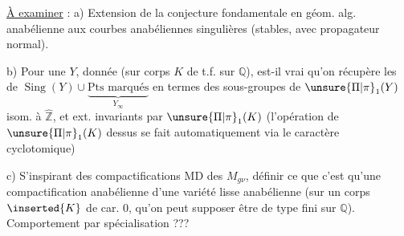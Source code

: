 
\uline{À examiner} : a) Extension de la conjecture fondamentale en géom. alg. anabélienne aux courbes anabéliennes  singulières (stables, avec propagateur normal). 

b) Pour une $Y$,  donnée (sur corps $K$ de t.f. sur $\mathbb Q$), est-il vrai qu'on récupère les  de  $\operatorname{Sing}(Y)\cup\underbrace{\text{Pts marqués}}_{Y_\infty}$ en termes des  sous-groupes de $\unsure{\Pi|\pi}_1(Y)$ isom. à $\widehat{\mathbb Z}$, et ext. invariants par $\unsure{\Pi|\pi}_1(K)$ (l'opération de $\unsure{\Pi|\pi}_1(K)$ dessus se fait automatiquement via le caractère cyclotomique)

c) S'inspirant des compactifications MD des $M_{g\nu}$, définir ce que c'est qu'une compactification anabélienne d'une variété lisse anabélienne (sur un corps $\inserted{K}$ de car. 0, qu'on peut supposer être de type fini sur $\mathbb Q$). Comportement par spécialisation ???

